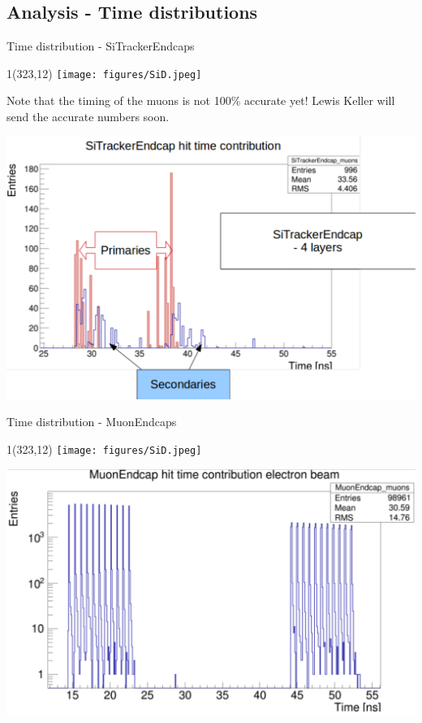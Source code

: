 \documentclass[xcolor={dvipsnames}]{beamer}
\newcommand{\sidlogo}{
  \setlength{\TPHorizModule}{1pt}
  \setlength{\TPVertModule}{1pt}
  \begin{textblock}{1}(323,12)
   \texttt{[image: figures/SiD.jpeg]}
  \end{textblock}
  }
\begin{document}
\subsection{Analysis - Time distributions}
\begin{frame}{Time distribution - \small SiTrackerEndcaps}
\sidlogo
Note that the timing of the muons is not 100\% accurate yet! Lewis Keller will send the accurate numbers soon.
 \begin{center}
\includegraphics[height=0.78\textheight]{Time_distribution_SiTrackerEndcaps.pdf}
\end{center}
\end{frame}
\begin{frame}{Time distribution - \small MuonEndcaps}
\sidlogo
 \begin{center}
\includegraphics[height=0.78\textheight]{Time_distribution_MuonEndcaps.pdf}
\end{center}
\end{frame}
\end{document}
